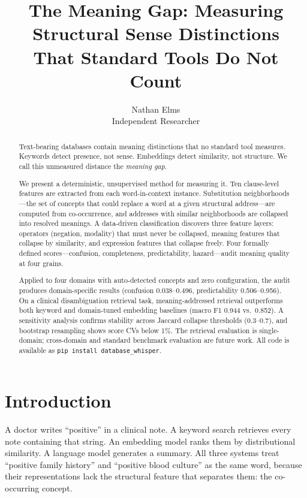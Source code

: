 \documentclass[11pt,a4paper]{article}
\title{The Meaning Gap: Measuring Structural Sense Distinctions\\That Standard Tools Do Not Count}
\author{Nathan Elms\\Independent Researcher}
\date{}
\begin{document}
\maketitle

\begin{abstract}
Text-bearing databases contain meaning distinctions that no standard tool measures. Keywords detect presence, not sense. Embeddings detect similarity, not structure. We call this unmeasured distance the \emph{meaning gap}.

We present a deterministic, unsupervised method for measuring it. Ten clause-level features are extracted from each word-in-context instance. Substitution neighborhoods---the set of concepts that could replace a word at a given structural address---are computed from co-occurrence, and addresses with similar neighborhoods are collapsed into resolved meanings. A data-driven classification discovers three feature layers: operators (negation, modality) that must never be collapsed, meaning features that collapse by similarity, and expression features that collapse freely. Four formally defined scores---confusion, completeness, predictability, hazard---audit meaning quality at four grains.

Applied to four domains with auto-detected concepts and zero configuration, the audit produces domain-specific results (confusion 0.038--0.496, predictability 0.506--0.956). On a clinical disambiguation retrieval task, meaning-addressed retrieval outperforms both keyword and domain-tuned embedding baselines (macro F1 0.944 vs.\ 0.852). A sensitivity analysis confirms stability across Jaccard collapse thresholds (0.3--0.7), and bootstrap resampling shows score CVs below 1\%. The retrieval evaluation is single-domain; cross-domain and standard benchmark evaluation are future work. All code is available as \texttt{pip install database\_whisper}.
\end{abstract}

\section{Introduction}

A doctor writes ``positive'' in a clinical note. A keyword search retrieves every note containing that string. An embedding model ranks them by distributional similarity. A language model generates a summary. All three systems treat ``positive family history'' and ``positive blood culture'' as the same word, because their representations lack the structural feature that separates them: the co-occurring concept.
\end{document}
